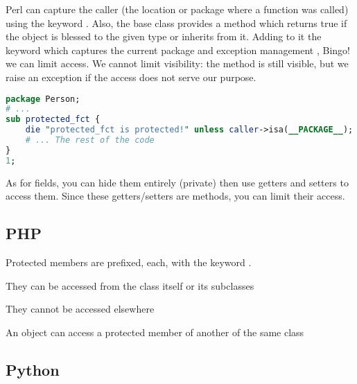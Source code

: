 \documentclass{KodeBook}
\begin{document}
Perl can capture the caller (the location or package where a function was called) using the keyword . 
Also, the base class  provides a method  which returns true if the object is blessed to the given type or inherits from it.
Adding to it the keyword  which captures the current package and exception management , Bingo! we can limit access. 
We cannot limit visibility: the method is still visible, but we raise an exception if the access does not serve our purpose.

\begin{lstlisting}[language=Perl, style=codeStyle]
package Person;
# ...
sub protected_fct {
	die "protected_fct is protected!" unless caller->isa(__PACKAGE__);
	# ... The rest of the code
}
1;
\end{lstlisting} 

As for fields, you can hide them entirely (private) then use getters and setters to access them. 
Since these getters/setters are methods, you can limit their access. 

%

\subsection{PHP}

Protected members are prefixed, each, with the keyword .



They can be accessed from the class itself or its subclasses



They cannot be accessed elsewhere



An object can access a protected member of another of the same class



\subsection{Python}
\end{document}
